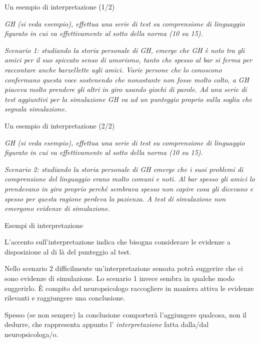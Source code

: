 \documentclass[
  ignorenonframetext,
]{beamer}
\begin{document}
\begin{frame}{Un esempio di interpretazione (1/2)}
\label{un-esempio-di-interpretazione-12}
\small

\emph{GH (si veda esempio), effettua una serie di test su comprensione
di linguaggio figurato in cui va effettivamente al sotto della norma (10
su 15).}

\emph{Scenario 1: studiando la storia personale di GH, emerge che GH è
noto tra gli amici per il suo spiccato senso di umorismo, tanto che
spesso al bar si ferma per raccontare anche barzellette agli amici.
Varie persone che lo conoscono confermano questa voce sostenendo che
nonostante non fosse molto colto, a GH piaceva molto prendere gli altri
in giro usando giochi di parole. Ad una serie di test aggiuntivi per la
simulazione GH va ad un punteggio proprio sulla soglia che segnala
simulazione.}
\end{frame}

\begin{frame}{Un esempio di interpretazione (2/2)}
\label{un-esempio-di-interpretazione-22}
\small

\emph{GH (si veda esempio), effettua una serie di test su comprensione
di linguaggio figurato in cui va effettivamente al sotto della norma (10
su 15).}

\emph{Scenario 2: studiando la storia personale di GH emerge che i suoi
problemi di comprensione del linguaggio erano molto comuni e noti. Al
bar spesso gli amici lo prendevano in giro proprio perché sembrava
spesso non capire cosa gli dicevano e spesso per questa ragione perdeva
la pazienza. A test di simulazione non emergono evidenze di
simulazione.}
\end{frame}

\begin{frame}{Esempi di interpretazione}
\label{esempi-di-interpretazione}
\small

L'accento sull'interpretazione indica che bisogna considerare le
evidenze a disposizione al di là del punteggio al test.

Nello scenario 2 difficilmente un'interpretazione sensata potrà
suggerire che ci sono evidenze di simulazione. Lo scenario 1 invece
sembra in qualche modo suggerirlo. È compito del neuropsicologo
raccogliere in maniera attiva le evidenze rilevanti e raggiungere una
conclusione.

Spesso (se non sempre) la conclusione comporterà l'aggiungere qualcosa,
non il dedurre, che rappresenta appunto l' \emph{interpretazione} fatta
dalla/dal neuropsicologa/o.
\end{frame}
\end{document}
